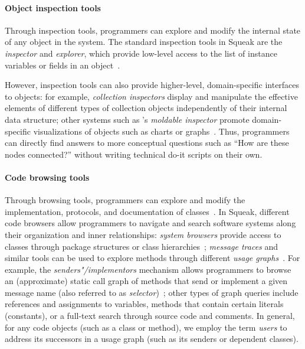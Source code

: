 	\paragraph{Object inspection tools}
	\label{par:background/expsys/tools/inspection}
	Through inspection tools, programmers can explore and modify the internal state of any object in the system.
	The standard inspection tools in Squeak are the \emph{inspector} and \emph{explorer}, which provide low-level access to the list of instance variables or fields in an object~\cites[chap.~8]{goldberg1984smalltalk}[sec.~6.3]{thiede2023squeak}.

	However, inspection tools can also provide higher-level, domain-specific interfaces to objects:
	for example, \emph{collection inspectors} display and manipulate the effective elements of different types of collection objects independently of their internal data structure; other systems such as 's \emph{moldable inspector} promote domain-specific visualizations of objects such as charts or graphs~\cite{chis2015moldable}.
	Thus, programmers can directly find answers to more conceptual questions such as ``How are these nodes connected?'' without writing technical do-it scripts on their own.

	\paragraph{Code browsing tools}
	\label{par:background/expsys/tools/browsing}
	Through browsing tools, programmers can explore and modify the implementation, protocols, and documentation of classes~\cite[sec.~6.2]{thiede2023squeak}.
	In Squeak, different code browsers allow programmers to navigate and search software systems along their organization and inner relationships:
	\emph{system browsers} provide access to classes through package structures or class hierarchies~\cite[chap.~9]{goldberg1984smalltalk}; \emph{message traces} and similar tools can be used to explore methods through different \emph{usage graphs}~\cite[chap.~10]{goldberg1984smalltalk}.
	For example, the \emph{senders"/implementors} mechanism allows programmers to browse an (approximate\footnotemark) static call graph of methods that send or implement a given message name (also referred to as \emph{selector})~\cite{thiede2022augmenting}; other types of graph queries include references and assignments to variables, methods that contain certain literals (constants), or a full-text search through source code and comments.
	In general, for any code objects (such as a class or method), we employ the term \emph{users} to address its successors in a usage graph (such as its senders or dependent classes).

